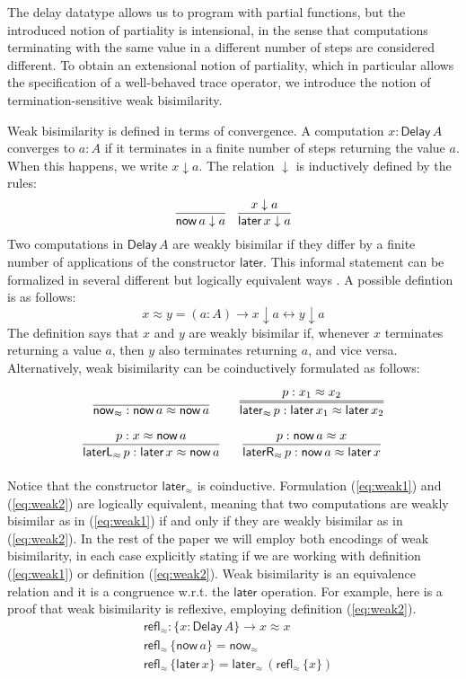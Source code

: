 \documentclass[runningheads,a4paper]{llncs}
\newcommand{\Delay}{\ensuremath{\mathsf{Delay}\,}}
\newcommand{\now}{\mathsf{now}}
\newcommand{\later}{\mathsf{later}}
\newcommand{\laterR}{\mathsf{laterR}}
\newcommand{\laterL}{\mathsf{laterL}}
\newcommand{\dn}{\downarrow}
\newcommand{\refl}{\mathsf{refl}}
\begin{document}
The delay datatype allows us to program with partial functions, but
the introduced notion of partiality is intensional, in the sense that
computations terminating with the same value in a different number of
steps are considered different. To obtain an extensional notion of
partiality, which in particular allows the specification of a
well-behaved trace operator, we introduce the notion of termination-sensitive
weak bisimilarity.

Weak bisimilarity is defined in terms of convergence. A computation
$x : \Delay A$ converges to $a : A$ if it terminates in a finite
number of steps returning the value $a$. When this happens, we write
$x \dn a$. The relation $\dn$ is inductively defined by the rules:
\[
\infer{\now\,a \dn a}{}
\quad
\infer{\later\,x \dn a}{x \dn a}
\]
Two computations in $\Delay A$ are weakly bisimilar if they differ by
a finite number of applications of the constructor $\later$. This
informal statement can be formalized in several different but
logically equivalent ways \cite{ChapmanUV19}. 
A possible defintion is as follows:
\begin{equation}\label{eq:weak1}
x \approx y = (a : A) \to x \dn a \leftrightarrow y \dn a
\end{equation}
The definition says that $x$ and $y$ are weakly bisimilar if, whenever
$x$ terminates returning a value $a$, then $y$ also terminates
returning $a$, and vice versa.
Alternatively, weak bisimilarity can be coinductively formulated as follows:
\begin{equation}
\label{eq:weak2}
\arraycolsep=8pt\def\arraystretch{2.8}
\begin{array}{cc}
\infer{\now_{\approx}  : \now\,a \approx \now\,a}{}
&
\infer={\later_{\approx} \,p : \later\,x_1 \approx \later\,x_2}{p : x_1 \approx x_2}
\\
\infer{\laterL_{\approx} \, p: \later\,x \approx \now\,a}{p : x \approx \now \,a}
&
\infer{\laterR_{\approx} \, p: \now\,a \approx \later\,x}{p : \now\,a \approx x}
\end{array}
\end{equation}
Notice that the constructor $\later_{\approx}$ is
coinductive. Formulation (\ref{eq:weak1}) and (\ref{eq:weak2}) are
logically equivalent, meaning that two computations are weakly
bisimilar as in (\ref{eq:weak1}) if and only if they are weakly
bisimilar as in (\ref{eq:weak2}).
In the rest of the paper we will employ
both encodings of weak bisimilarity, in each case explicitly stating
if we are working with definition (\ref{eq:weak1}) or definition (\ref{eq:weak2}).
Weak bisimilarity is an equivalence
relation and it is a congruence w.r.t. the $\later$ operation.
For example, here is a proof that weak bisimilarity is reflexive,
employing definition (\ref{eq:weak2}).
\begin{align*}
& \refl_{\approx} : \{x : \Delay A\} \to x \approx x \\
& \refl_{\approx} \,\{\now\,a\} = \now_\approx \\
& \refl_{\approx} \,\{\later\,x\} = \later_\approx\,(\refl_\approx \,\{x\})
\end{align*}
\end{document}
